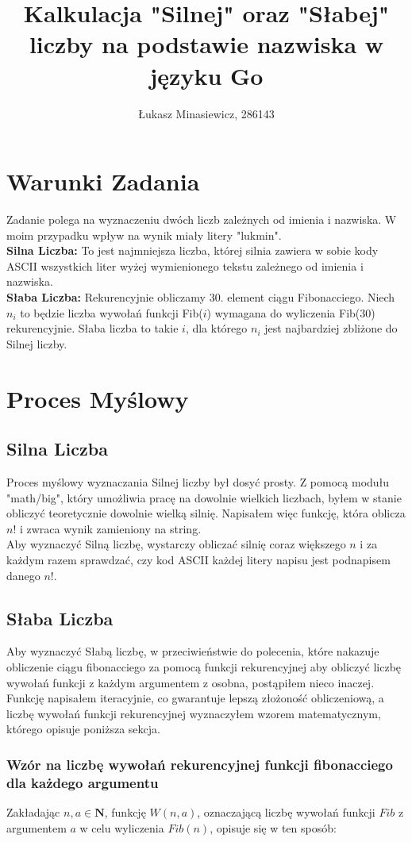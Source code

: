 \documentclass{article}
\title{Kalkulacja "Silnej" oraz "Słabej" liczby na podstawie nazwiska w języku Go}
\author{Łukasz Minasiewicz, 286143}
\begin{document}
\maketitle
\section{Warunki Zadania}
Zadanie polega na wyznaczeniu dwóch liczb zależnych od imienia i nazwiska. W moim przypadku wpływ na wynik miały litery "lukmin".\\
\textbf{Silna Liczba:} To jest najmniejsza liczba, której silnia zawiera w sobie kody ASCII wszystkich liter wyżej wymienionego tekstu zależnego od imienia i nazwiska.\\
\textbf{Słaba Liczba:} Rekurencyjnie obliczamy 30. element ciągu Fibonacciego. Niech $n_i$ to będzie liczba wywołań funkcji Fib($i$) wymagana do wyliczenia Fib($30$) rekurencyjnie. Słaba liczba to takie $i$, dla którego $n_i$ jest najbardziej zbliżone do Silnej liczby.

\section{Proces Myślowy}
\subsection{Silna Liczba}
Proces myślowy wyznaczania Silnej liczby był dosyć prosty. Z pomocą modułu "math/big", który umożliwia pracę na dowolnie wielkich liczbach, byłem w stanie obliczyć teoretycznie dowolnie wielką silnię. Napisałem więc funkcję, która oblicza $n!$ i zwraca wynik zamieniony na string. \\
Aby wyznaczyć Silną liczbę, wystarczy obliczać silnię coraz większego $n$ i za każdym razem sprawdzać, czy kod ASCII każdej litery napisu jest podnapisem danego $n!$.
\subsection{Słaba Liczba}
Aby wyznaczyć Słabą liczbę, w przeciwieństwie do polecenia, które nakazuje obliczenie ciągu fibonacciego za pomocą funkcji rekurencyjnej aby obliczyć liczbę wywołań funkcji z każdym argumentem z osobna, postąpiłem nieco inaczej. Funkcję napisałem iteracyjnie, co gwarantuje lepszą złożoność obliczeniową, a liczbę wywołań funkcji rekurencyjnej wyznaczyłem wzorem matematycznym, którego opisuje poniższa sekcja.
\subsubsection{Wzór na liczbę wywołań rekurencyjnej funkcji fibonacciego dla każdego argumentu}
Zakładając $n, a \in \mathbf{N}$, funkcję $W(n, a)$, oznaczającą liczbę wywołań funkcji $Fib$ z argumentem $a$ w celu wyliczenia $Fib(n)$, opisuje się w ten sposób:\\
\end{document}
